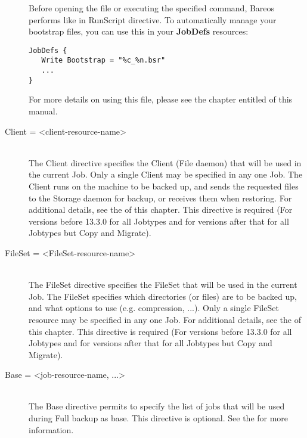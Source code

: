 \begin{description}
Before opening the file or executing the
specified command, Bareos performs
 like in RunScript
directive. To automatically manage your bootstrap files, you can use
this in your {\bf JobDefs} resources:
\begin{verbatim}
JobDefs {
   Write Bootstrap = "%c_%n.bsr"
   ...
}
\end{verbatim}

For more details on using this file, please see the chapter entitled
 of this manual.

\item [Client = {\textless}client-resource-name{\textgreater}] \hfill \\
The Client directive  specifies the Client (File daemon) that will be used in
the  current Job. Only a single Client may be specified in any one Job.  The
Client runs on the machine to be backed up,  and sends the requested files to
the Storage daemon for backup,  or receives them when restoring. For
additional details, see the
 of this chapter.
This directive is required (For versions before 13.3.0 for all Jobtypes
and for versions after that for all Jobtypes but Copy and Migrate).

\item [FileSet = {\textless}FileSet-resource-name{\textgreater}] \hfill \\
The FileSet directive specifies the FileSet that will be used in the
current Job.  The FileSet specifies which directories (or files) are to
be backed up, and what options to use (e.g.  compression, ...).  Only a
single FileSet resource may be specified in any one Job.  For additional
details, see the  of
this chapter.
This directive is required (For versions before 13.3.0 for all Jobtypes
and for versions after that for all Jobtypes but Copy and Migrate).

\item [Base = {\textless}job-resource-name, ...{\textgreater}] \hfill \\
The Base directive permits to specify the list of jobs that will be used during
Full backup as base. This directive is optional. See the  for more information.


\end{description}
